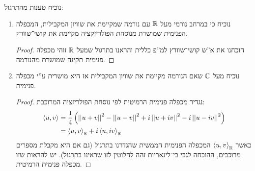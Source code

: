 \documentclass[]{../../../../../tex/classes/homework}
\renewcommand\mut[2] {\left \la #1, #2 \right \ra}
\begin{document}
	\section{}
	נוכיח טענות מהתרגול: 
	\begin{enumerate}
		\item נוכיח כי במרחב נורמי מעל $\mathbb{R}$ עם נורמה שמקיימת את שוויון המקבילית, המכפלה הפנימית שמושרת מנוסחת הפולריזקציה מקיימת את קושי־שוורץ. \begin{proof}
			הוכחנו את א''ש קושי־שוורץ למ''פ כללית והראנו בתרגול שמעל $\mathbb{R}$ זוהי מכפלה פנימית תקינה שמושרת מהנורמה. 
		\end{proof}
		\item נוכיח מעל $\mathbb{C}$ שאם הנורמה מקיימת את שוויון המקבילית אז היא מושרית ע''י מכפלה פנימית. \begin{proof}
			נגדיר מכפלה פנימית הרמיטית לפי נוסחת הפולריזציה המרוכבת: 
			\begin{align*}
				\mut{u}{v} &= \frac{1}{4}\cl{\norm{u + v}^{2} - \norm{u - v}^{2} + i\norm{u + iv}^{2} - i\norm{u - iv}^{2}} \\
				&= \mut{u}{v}_\R + i\mut{u}{iv}_\R
			\end{align*}
			כאשר $\mut{u}{v}_\R$ המכפלה הפנימית הממשית שהגדרנו בתרגול (גם אם היא מקבלת מספרים מרוכבים, ההוכחה לגבי בי־לינאריות זהה לחלוטין לזו שראינו בתרגול). יש להראות שזו מכפלה פנימית הרמיטית. 
			

\end{proof}
\end{enumerate}
\end{document}
